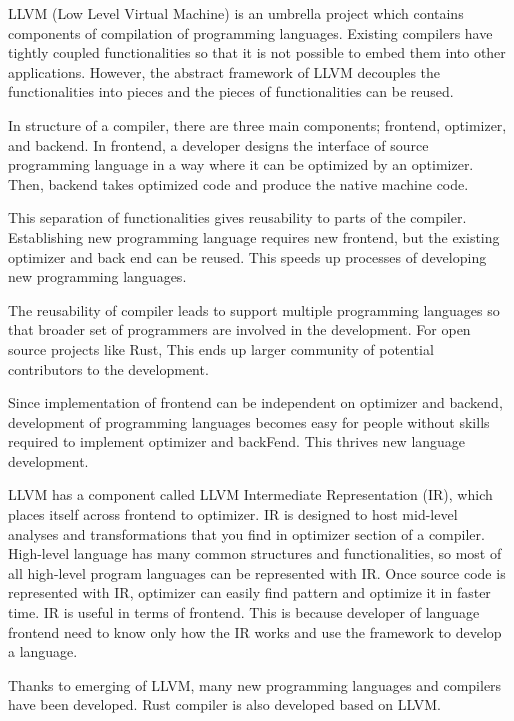 LLVM (Low Level Virtual Machine) \cite{DBLP:conf/cgo/LattnerA04} is an umbrella project which contains components of compilation of programming languages.
Existing compilers have tightly coupled functionalities so that it is not possible to embed them into other applications.
However, the abstract framework of LLVM decouples the functionalities into pieces and the pieces of functionalities can be reused.

In structure of a compiler, there are three main components; frontend, optimizer, and backend. 
In frontend, a developer designs the interface of source programming language in a way where it can be optimized by an optimizer. 
Then, backend takes optimized code and produce the native machine code. 

This separation of functionalities gives reusability to parts of the compiler. Establishing new programming language requires new frontend, 
but the existing optimizer and back end can be reused. This speeds up processes of developing new programming languages.

The reusability of compiler leads to support multiple programming languages 
so that broader set of programmers are involved in the development. 
For open source projects like Rust, This ends up larger community of potential contributors to the development.

Since implementation of frontend can be independent on optimizer and backend, 
development of programming languages becomes easy for people without skills required to implement optimizer and backFend.
This thrives new language development.

LLVM has a component called LLVM Intermediate Representation (IR), 
which places itself across frontend to optimizer. IR is designed to host mid-level analyses and transformations that you find in optimizer section of a compiler.
High-level language has many common structures and functionalities, so most of all high-level program languages can be represented with IR. 
Once source code is represented with IR, optimizer can easily find pattern and optimize it in faster time. 
IR is useful in terms of frontend. This is because developer of language frontend need to know only how the IR works and use the framework to develop a language.

Thanks to emerging of LLVM, many new programming languages and compilers have been developed. Rust compiler is also developed based on LLVM.


